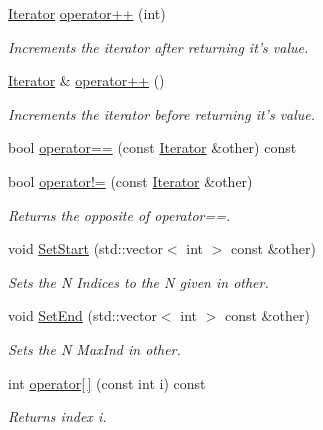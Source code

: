 \begin{DoxyCompactItemize}
\hyperlink{classJKBuilder_1_1Iterator}{Iterator} \hyperlink{classJKBuilder_1_1Iterator_ac1702aedba13b4112b891b58dfd78eba}{operator++} (int)
\begin{DoxyCompactList}\small\item\em Increments the iterator after returning it's value. \item\end{DoxyCompactList}\item 
\hyperlink{classJKBuilder_1_1Iterator}{Iterator} \& \hyperlink{classJKBuilder_1_1Iterator_ae1f21c74128a5ef5d1b9de72ceb09be8}{operator++} ()
\begin{DoxyCompactList}\small\item\em Increments the iterator before returning it's value. \item\end{DoxyCompactList}\item 
bool \hyperlink{classJKBuilder_1_1Iterator_a1ea001976a5bc8ae8dc365e2a912b59a}{operator==} (const \hyperlink{classJKBuilder_1_1Iterator}{Iterator} \&other) const 
\item 
bool \hyperlink{classJKBuilder_1_1Iterator_a8c06af8ae0d9d1614ae9f81629275926}{operator!=} (const \hyperlink{classJKBuilder_1_1Iterator}{Iterator} \&other)
\begin{DoxyCompactList}\small\item\em Returns the opposite of operator==. \item\end{DoxyCompactList}\item 
void \hyperlink{classJKBuilder_1_1Iterator_aa83de505e29125c1d3ac7bb1b13ca15a}{SetStart} (std::vector$<$ int $>$ const \&other)
\begin{DoxyCompactList}\small\item\em Sets the N Indices to the N given in other. \item\end{DoxyCompactList}\item 
void \hyperlink{classJKBuilder_1_1Iterator_aad84ec668b5f41210db34c540aaa31fc}{SetEnd} (std::vector$<$ int $>$ const \&other)
\begin{DoxyCompactList}\small\item\em Sets the N MaxInd in other. \item\end{DoxyCompactList}\item 
int \hyperlink{classJKBuilder_1_1Iterator_a74247cf730a06b23fcb1ec64e5596b25}{operator\mbox{[}$\,$\mbox{]}} (const int i) const 
\begin{DoxyCompactList}\small\item\em Returns index i. \item\end{DoxyCompactList}\end{DoxyCompactItemize}
